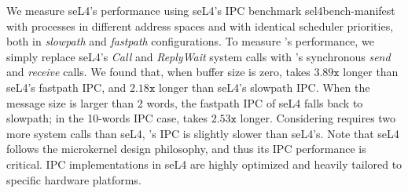 We measure seL4's performance using seL4's IPC benchmark
sel4bench-manifest~\cite{sel4bench} with
processes in different address spaces and with identical scheduler priorities,
both in \emph{slowpath} and \emph{fastpath} configurations. To measure \cCTOS{}'s
performance, we simply replace seL4's
\emph{Call} and \emph{ReplyWait} system calls with {\cCTOS}'s synchronous
\emph{send} and \emph{receive} calls.
We found that, when buffer size is zero, \cCTOS{} takes $3.89\mathtt{x}$ 
longer than seL4's fastpath IPC,
and $2.18\mathtt{x}$ longer than seL4's slowpath IPC. When the message size is larger than 2
words, the fastpath IPC of seL4 falls back to slowpath; in the 10-words IPC
case, \cCTOS{} takes $2.53\mathtt{x}$ longer. 
Considering \cCTOS{} requires two more system
calls than seL4, \cCTOS{}'s IPC  is slightly slower than seL4's.
Note that seL4 follows the microkernel design philosophy, and thus its IPC performance is
critical. IPC implementations in seL4 are highly optimized and heavily tailored
to specific hardware platforms. 


